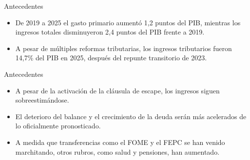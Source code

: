 \begin{frame}{Antecedentes}
\begin{itemize}
    \item De 2019 a 2025 el gasto primario aumentó 1,2 puntos del PIB, mientras los ingresos totales disminuyeron 2,4 puntos del PIB frente a 2019.
    \item A pesar de múltiples reformas tributarias, los ingresos tributarios fueron 14,7\% del PIB en 2025, después del repunte transitorio de 2023.
\end{itemize}
\end{frame}

\begin{frame}{Antecedentes}
\begin{itemize}
    \item A pesar de la activación de la cláusula de escape, los ingresos siguen sobreestimándose.
    \item El deterioro del balance y el crecimiento de la deuda serán más acelerados de lo oficialmente pronosticado.
    \item A medida que transferencias como el FOME y el FEPC se han venido marchitando, otros rubros, como salud y pensiones, han aumentado.
\end{itemize}
\end{frame}